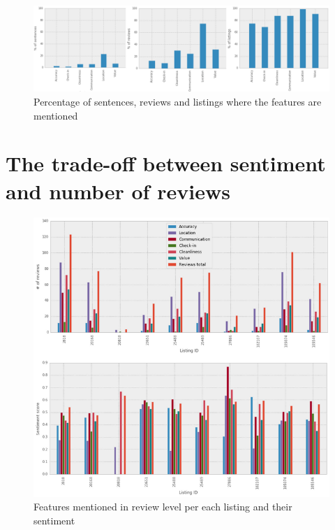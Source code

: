\begin{figure}[h!]
\centering
	\includegraphics[height=0.2\textheight]{feature_mentioned}
	\caption{Percentage of sentences, reviews and listings where the features are mentioned}
	\label{fig:fea}
\end{figure} 
%
%
%
\section{The trade-off between sentiment and number of reviews}
%
%
\begin{figure}[h!]
	\includegraphics[height=0.75\textheight]{features_sentiment}
	\caption{Features mentioned in review level per each listing and their sentiment}
	\label{fig:feasent}
\end{figure}
